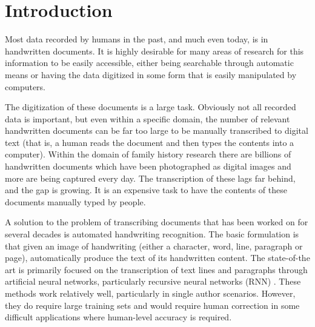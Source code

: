 \documentclass[ms,electronic,twosidetoc,letterpaper,chaptercenter,parttop,lof,lot]{byumsphd}
\title{\Title}
\author{\Author}
\begin{document}
\maketitle
{}

\chapter{Introduction}

Most data recorded by humans in the past, and much even today, is in handwritten documents. 
It is highly desirable for many areas of research for this information to be easily accessible, either being searchable through automatic means or having the data digitized in some form that is easily manipulated by computers.

The digitization of these documents is a large task. Obviously not all recorded data is important, but even within a specific domain, the number of relevant handwritten documents can be far too large to be manually transcribed to digital text (that is, a human reads the document and then types the contents into a computer). Within the domain of family history research there are billions of handwritten documents which have been photographed as digital images and more are being captured every day.
The transcription of these lags far behind, and the gap is growing. It is an expensive task to have the contents of these documents manually typed by people.

A solution to the problem of transcribing documents that has been worked on for several decades is automated handwriting recognition. The basic formulation is that given an image of handwriting (either a character, word, line, paragraph or page), automatically produce the text of its handwritten content. The state-of-the art is primarily focused on the transcription of text lines and paragraphs through artificial neural networks, particularly recursive neural networks (RNN) \cite{icfhrComp2016, wigington2017, icdarComp2017}. These methods work relatively well, particularly in single author scenarios. However, they do require large training sets and would require human correction in some difficult applications where human-level accuracy is required.
\end{document}
